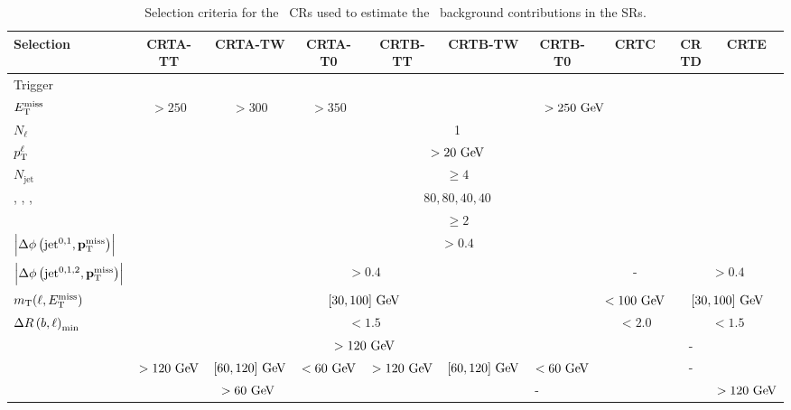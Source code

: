 	\begin{landscape}
	\begin{table}[htpb]
	  \caption{Selection criteria for the \ttbar\ \acp{CR} used to estimate the \ttbar\ background contributions in the \acp{SR}.} 
	  \begin{center}
	    \def\arraystretch{1.5}
		\tiny
	    \begin{tabular}{lccccccccc}
	      \toprule
	      \textbf{Selection}  & \textbf{CRTA-TT} & \textbf{CRTA-TW} & \textbf{CRTA-T0} & \textbf{CRTB-TT} & \textbf{CRTB-TW} & \textbf{CRTB-T0} & \textbf{CRTC} & \textbf{CRTD} & \textbf{CRTE} \\
	      \toprule
	      Trigger    & \multicolumn{9}{c}{\met}                                                                         \\ 
			 $E_{\mathrm{T}}^{\mathrm{miss}}$ & $ >250$ \gev & $ >300$ \gev & $ >350$ \gev & \multicolumn{6}{c}{$>250 \gev$} \\  \midrule
	      $N_{\ell}$ & \multicolumn{9}{c}{1}                                                                            \\ 
	     $p_{\mathrm{T}}^{\ell}$ & \multicolumn{9}{c}{$>20 \gev$}   \\ 
	     \midrule
	     $N_{\mathrm{jet}}$ & \multicolumn{9}{c}{$\ge 4$} \\ %
	      \ptzero, \ptone, \pttwo, \ptthree & \multicolumn{9}{c}{$80,80,40,40$ \gev} \\
	      \nBJet & \multicolumn{9}{c}{$ \ge 2 $}\\
			\midrule
	      $\left|\Delta\phi\left(\mathrm{jet}^{0,1},\mathbf{p}_\mathrm{T}^\mathrm{miss}\right)\right|$ & \multicolumn{9}{c}{$>0.4$} \\ 
	      $\left|\Delta\phi\left(\mathrm{jet}^{0,1,2},\mathbf{p}_\mathrm{T}^\mathrm{miss}\right)\right|$ & \multicolumn{6}{c}{$>0.4$} & - & \multicolumn{2}{c}{$>0.4$}\\ 
	      $m_{\mathrm{T}}(\ell,E_{\mathrm{T}}^{\mathrm{miss}})$   &     \multicolumn{6}{c}{$[30,100]\gev$} & $<100\gev$ & \multicolumn{2}{c}{$[30,100]\gev$}  \\ 
	       $\Delta R\left(b,\ell\right)_{\mathrm{min}}$ & \multicolumn{6}{c}{$<1.5$} & $<2.0$ &  \multicolumn{2}{c}{$<1.5$}\\
	       \midrule
	       \mantikttwelvezero      & \multicolumn{6}{c}{$>120 \gev$} & \multicolumn{3}{c}{-} \\ 
	       \mantikttwelveone      & $>120 \gev$  & $[60, 120] \gev$  & $<60 \gev$  & $>120 \gev$  & $[60, 120] \gev$  & $<60 \gev$ & \multicolumn{3}{c}{-} \\ 
			 \mantikteightzero      & \multicolumn{3}{c}{$>60 \gev$} &  \multicolumn{5}{c}{-} & $>120 \gev$ \\ 

\end{tabular}
\end{center}
\end{table}
\end{landscape}
